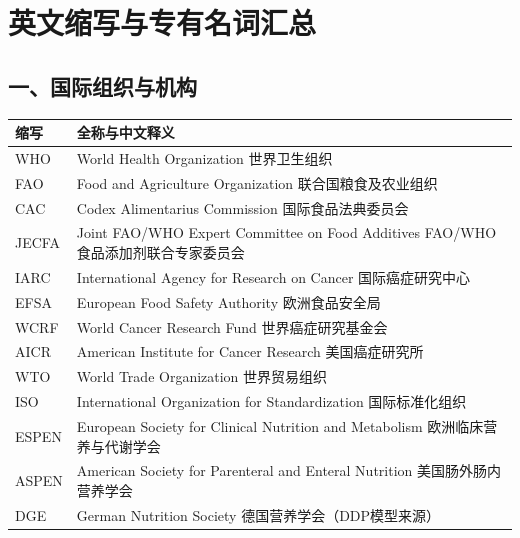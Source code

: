 \chapter{英文缩写与专有名词汇总}

\section{一、国际组织与机构}

\begin{table}[H]
\centering
\begin{tabularx}{\textwidth}{lX}
\toprule
\textbf{缩写} & \textbf{全称与中文释义} \\
\midrule
WHO & World Health Organization \hfill 世界卫生组织 \\
FAO & Food and Agriculture Organization \hfill 联合国粮食及农业组织 \\
CAC & Codex Alimentarius Commission \hfill 国际食品法典委员会 \\
JECFA & Joint FAO/WHO Expert Committee on Food Additives \hfill FAO/WHO食品添加剂联合专家委员会 \\
IARC & International Agency for Research on Cancer \hfill 国际癌症研究中心 \\
EFSA & European Food Safety Authority \hfill 欧洲食品安全局 \\
WCRF & World Cancer Research Fund \hfill 世界癌症研究基金会 \\
AICR & American Institute for Cancer Research \hfill 美国癌症研究所 \\
WTO & World Trade Organization \hfill 世界贸易组织 \\
ISO & International Organization for Standardization \hfill 国际标准化组织 \\
ESPEN & European Society for Clinical Nutrition and Metabolism \hfill 欧洲临床营养与代谢学会 \\
ASPEN & American Society for Parenteral and Enteral Nutrition \hfill 美国肠外肠内营养学会 \\
DGE & German Nutrition Society \hfill 德国营养学会（DDP模型来源） \\
\bottomrule
\end{tabularx}
\end{table}

